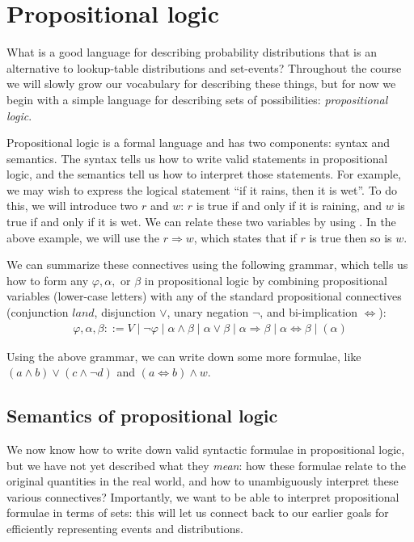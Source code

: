 \documentclass{tufte-handout}
\begin{document}
\section{Propositional logic}

What is a good language for describing probability distributions that is an 
alternative to lookup-table distributions and set-events? Throughout the course 
we will slowly grow our vocabulary for describing these things, but for now we 
begin with a simple language for describing sets of possibilities: \emph{propositional logic}.

Propositional logic is a formal language and has two components: syntax and
semantics. The syntax tells us how to write valid statements in propositional
logic, and the semantics tell us how to interpret those statements. For example, we 
may wish to express the logical statement ``if it rains, then it is wet''. To do 
this, we will introduce two  $r$ and $w$: $r$ is true 
if and only if it is raining, and $w$ is true if and only if it is wet. We can 
relate these two variables by using . In the above example, 
we will use the  $r \Rightarrow w$, which states that if $r$ is 
true then so is $w$. 

We can summarize these connectives using the following grammar, which tells us how to form 
any  $\varphi, \alpha,$ or $\beta$ in propositional
logic by combining propositional variables
(lower-case letters) with any of the standard propositional connectives (conjunction $land$, disjunction $\lor$, 
unary negation $\neg$, and bi-implication $\Leftrightarrow$):
\begin{align}
    \varphi, \alpha, \beta ::= V \mid \neg \varphi \mid \alpha \land \beta \mid 
    \alpha \lor \beta \mid \alpha \Rightarrow \beta \mid \alpha \Leftrightarrow \beta 
    \mid (\alpha)
\end{align}

Using the above grammar, we can write down some more formulae, like
$(a \land b) \lor (c \land \neg d)$ and $(a \Leftrightarrow b) \land w$.

\subsection{Semantics of propositional logic}
We now know how to write down valid syntactic formulae in propositional logic, but 
we have not yet described what they \emph{mean}: how these formulae relate to the 
original quantities in the real world, and how to unambiguously interpret these various
connectives? Importantly, we want to be able to interpret propositional formulae 
in terms of sets: this will let us connect back to our earlier goals for 
efficiently representing events and distributions.
\end{document}
